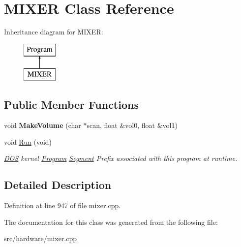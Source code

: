 \hypertarget{classMIXER}{\section{M\-I\-X\-E\-R Class Reference}
\label{classMIXER}
}
Inheritance diagram for M\-I\-X\-E\-R\-:\begin{figure}[H]
\begin{center}
\leavevmode
\includegraphics[height=2.000000cm]{classMIXER}
\end{center}
\end{figure}
\subsection*{Public Member Functions}
\begin{DoxyCompactItemize}
\item 
\hypertarget{classMIXER_a85b8e090dc7b9a2c6d3fdf0935e7f824}{void {\bfseries Make\-Volume} (char $\ast$scan, float \&vol0, float \&vol1)}\label{classMIXER_a85b8e090dc7b9a2c6d3fdf0935e7f824}

\item 
\hypertarget{classMIXER_a5043b553511d83536361a96111c17a31}{void \hyperlink{classMIXER_a5043b553511d83536361a96111c17a31}{Run} (void)}\label{classMIXER_a5043b553511d83536361a96111c17a31}

\begin{DoxyCompactList}\small\item\em \hyperlink{classDOS}{D\-O\-S} kernel \hyperlink{classProgram}{Program} \hyperlink{structSegment}{Segment} Prefix associated with this program at runtime. \end{DoxyCompactList}\end{DoxyCompactItemize}


\subsection{Detailed Description}


Definition at line 947 of file mixer.\-cpp.



The documentation for this class was generated from the following file\-:\begin{DoxyCompactItemize}
\item 
src/hardware/mixer.\-cpp\end{DoxyCompactItemize}
